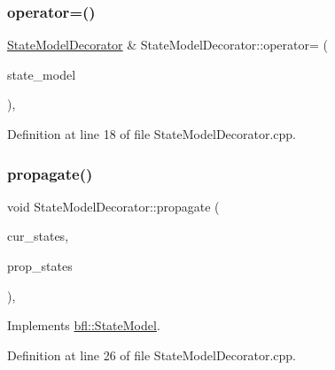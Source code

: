 \subsubsection{\texorpdfstring{operator=()}{operator=()}}
{\footnotesize\ttfamily \mbox{\hyperlink{classbfl_1_1StateModelDecorator}{State\+Model\+Decorator}} \& State\+Model\+Decorator\+::operator= (\begin{DoxyParamCaption}\item[{\mbox{\hyperlink{classbfl_1_1StateModelDecorator}{State\+Model\+Decorator}} \&\&}]{state\+\_\+model }\end{DoxyParamCaption})\hspace{0.3cm}{\ttfamily [protected]}, {\ttfamily [noexcept]}}



Definition at line 18 of file State\+Model\+Decorator.\+cpp.

\mbox{\label{classbfl_1_1StateModelDecorator_a3780afac5fc0e542cf4517c2057f9957}} 
\subsubsection{\texorpdfstring{propagate()}{propagate()}}
{\footnotesize\ttfamily void State\+Model\+Decorator\+::propagate (\begin{DoxyParamCaption}\item[{const Eigen\+::\+Ref$<$ const Eigen\+::\+Matrix\+Xf $>$ \&}]{cur\+\_\+states,  }\item[{Eigen\+::\+Ref$<$ Eigen\+::\+Matrix\+Xf $>$}]{prop\+\_\+states }\end{DoxyParamCaption})\hspace{0.3cm}{\ttfamily [override]}, {\ttfamily [virtual]}}



Implements \mbox{\hyperlink{classbfl_1_1StateModel_a47a625abb7df9b7afa689ccb9aa11aee}{bfl\+::\+State\+Model}}.



Definition at line 26 of file State\+Model\+Decorator.\+cpp.

\mbox{\label{classbfl_1_1StateModelDecorator_ad292f3b665c1adf20a1f32dc8a065fec}} 
